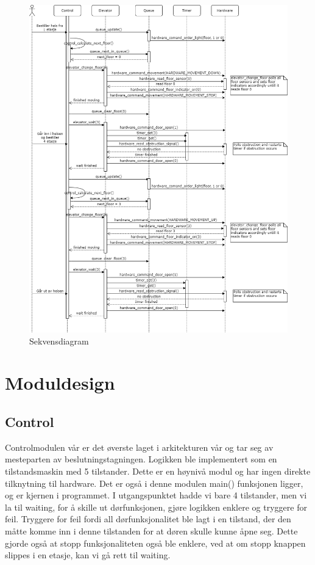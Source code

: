 \documentclass{article}
\begin{document}
\begin{figure}[hp]
    \centering
  \includegraphics[height=\textheight]{rapport/Sekvensdiagram.png}
  \caption{Sekvensdiagram}
  \label{fig:sekvensdi}
\end{figure}

\section{Moduldesign}
\subsection{Control}
Controlmodulen vår er det øverste laget i arkitekturen vår og tar seg av mesteparten av beslutningstagningen. Logikken ble implementert som en tilstandsmaskin med 5 tilstander. Dette er en høynivå modul og har ingen direkte tilknytning til hardware. Det er også i denne modulen main() funksjonen ligger, og er kjernen i programmet. I utgangspunktet hadde vi bare 4 tilstander, men vi la til waiting, for å skille ut dørfunksjonen, gjøre logikken enklere og tryggere for feil. Tryggere for feil fordi all dørfunksjonalitet ble lagt i en tilstand, der den måtte komme inn i denne tilstanden for at døren skulle kunne åpne seg.  Dette gjorde også at stopp funksjonaliteten også ble enklere, ved at om stopp knappen slippes i en etasje, kan vi gå rett til waiting.
\end{document}
